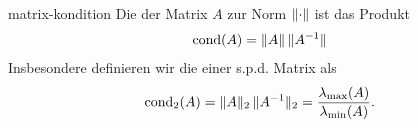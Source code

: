 \begin{Definition}{matrix-kondition}
  Die  der Matrix $A$ zur Norm $\lVert\cdot\rVert$ ist das Produkt
  \begin{gather}
    \operatorname{cond}(A) = \lVert A\rVert \,\lVert A^{-1}\rVert
  \end{gather}
  Insbesondere definieren wir die  einer
  s.p.d. Matrix als
  \begin{gather}
    \operatorname{cond}_2(A) = \lVert A\rVert_2 \,\lVert A^{-1}\rVert_2 = \frac{\lambda_{\max}(A)}{\lambda_{\min}(A)}.    
  \end{gather}
\end{Definition}


